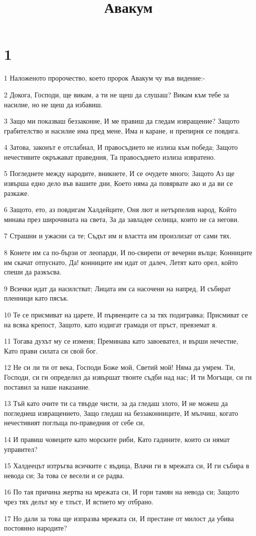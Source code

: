 

\title{Авакум}


\chapter{1}

\par 1 Наложеното пророчество, което пророк Авакум чу във видение:-
\par 2 Докога, Господи, ще викам, а ти не щеш да слушаш? Викам към тебе за насилие, но не щеш да избавиш.
\par 3 Защо ми показваш беззаконие, И ме правиш да гледам извращение? Защото грабителство и насилие има пред мене, Има и каране, и препирня се повдига.
\par 4 Затова, законът е отслабнал, И правосъдието не излиза към победа; Защото нечестивите окръжават праведния, Та правосъдието излиза извратено.
\par 5 Погледнете между народите, вникнете, И се очудете много; Защото Аз ще извърша едно дело във вашите дни, Което няма да повярвате ако и  да ви се разкаже.
\par 6 Защото, ето, аз повдигам Халдейците, Оня лют и нетърпелив народ, Който минава през широчината на света, За да завладее селища, които не са негови.
\par 7 Страшни и ужасни са те; Съдът им и властта им произлизат от сами тях.
\par 8 Конете им са по-бързи от леопарди, И по-свирепи от вечерни вълци; Конниците им скачат отпуснато, Да! конниците им идат от далеч, Летят като орел, който спеши да разкъсва.
\par 9 Всички идат да насилстват; Лицата им са насочени на напред, И събират пленници като пясък.
\par 10 Те се присмиват на царете, И първенците са за тях подигравка; Присмиват се на всяка крепост, Защото, като издигат грамади от пръст, превземат я.
\par 11 Тогава духът му се изменя; Преминава като завоевател, и върши нечестие, Като прави силата си свой бог.
\par 12 Не си ли ти от века, Господи Боже мой, Светий мой! Няма да умрем. Ти, Господи, си ги определил да извършат твоите съдби над нас; И ти Могъщи, си ги поставил за наше наказание.
\par 13 Тъй като очите ти са твърде чисти, за да гледаш злото, И не можеш да погледнеш извращението, Защо гледаш на беззаконниците, И мълчиш, когато нечестивият поглъща по-праведния от себе си,
\par 14 И правиш човеците като морските риби, Като гадините, които си нямат управител?
\par 15 Халдеецът изтръгва всичките с въдица, Влачи ги в мрежата си, И ги събира в невода си; За това се весели и се радва.
\par 16 По тая причина жертва на мрежата си, И гори тамян на невода си; Защото чрез тях делът му е тлъст, И ястието му отбрано.
\par 17 Но дали за това ще изпразва мрежата си, И престане от милост да убива постоянно народите?

